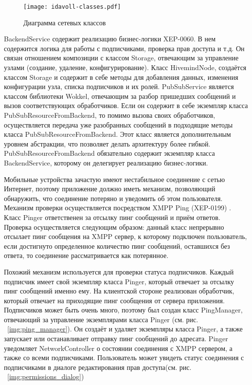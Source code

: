 \begin{figure}
  \centering
  \texttt{[image: idavoll-classes.pdf]}
  \caption{Диаграмма сетевых классов}
  \label{img:network_classes}
\end{figure}

BackendService содержит реализацию бизнес-логики XEP-0060. В нем содержится
логика для работы с подписчиками, проверка прав доступа и т.д. Он связан
отношением композиции с классом Storage, отвечающим за управление узлами
(создание, удаление, конфигурирование). Класс HivemindNode, создаётся классом
Storage и содержит в себе методы для добавления данных, изменения конфигурации
узла, списка подписчиков и их ролей. PubSubService является классом библиотеки
Wokkel, отвечающим за разбор пришедших сообщений и вызов соответствующих
обработчиков. Если он содержит в себе экземпляр класса
PubSubResourceFromBackend, то помимо вызова своих обработчиков, осуществляется
передача уже разобранных сообщений в подходящие методы класса
PubSubResourceFromBackend. Этот класс является дополнительным уровнем
абстракции, что позволяет делать архитектуру более гибкой.
PubSubResourceFromBackend обязательно содержит экземпляр класса BackendService,
которому он делегирует реализацию бизнес-логики.

Мобильные устройства зачастую имеют нестабильное соединение с сетью Интернет,
поэтому приложение должно иметь механизм, позволяющий обнаружить, что соединение
потеряно и уведомить об этом пользователя. Механизм проверки осуществляется
посредством XMPP Ping (XEP-0199) \cite{xep-0199}. Класс Pinger
ответственен за отсылку пинг сообщений и приём ответов. Проверка осуществляется
следующим образом: данный класс непрерывно отсылает пинг сообщения на XMPP
сервер, к которому подключен пользователь, если достигнуто определенное
количество пинг сообщений, оставшихся без ответа, то соединение рассматривается
как потерянное.

Похожий механизм используется для проверки статуса подписчиков. Каждый подписчик
имеет свой экземпляр класса Pinger, который отвечает за отсылку пинг сообщений
именно ему. На клиентской стороне реализован обработчик, который отвечает на
приходящие пинг сообщения от сервера приложения. Подписчиков может быть очень
много, поэтому был создан класс PingManager, отвечающий за управление
экземплярами класса Pinger (см. рис. ~\ref{img:ping_manager}). Он создаёт и
удаляет экземпляры класса Pinger, а также запускает или останавливает отправку
пинг сообщений до адресата. Pinger уведомляет NetworkController о состоянии
соединения с XMPP сервером, а также со всеми подписчиками. Пользователь может
увидеть статус соединения с подписчиками в диалоге редактирования прав
доступа(см. рис. ~\ref{img:permissions_dialog})

